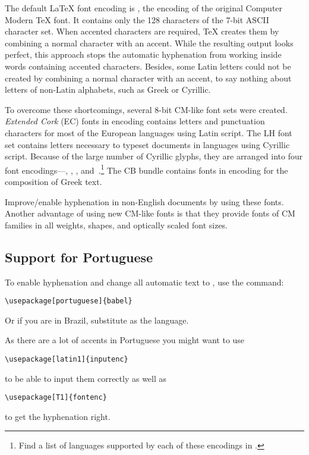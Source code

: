 The default \LaTeX{} font encoding is \label{OT1} , the encoding of the
original Computer Modern \TeX{} font. It contains only the 128
characters of the 7-bit ASCII character set. When accented characters
are required, \TeX{} creates them by combining a normal character with
an accent. While the resulting output looks perfect, this approach stops
the automatic hyphenation from working inside words containing accented
characters. Besides, some Latin letters could not be created by
combining a normal character with an accent, to say nothing about letters of
non-Latin alphabets, such as Greek or Cyrillic.

To overcome these shortcomings, several 8-bit CM-like font sets were created.
\emph{Extended Cork} (EC) fonts in  encoding contains 
letters and punctuation characters for most of the European
languages using Latin script. The LH font set contains letters necessary
to typeset documents in languages using Cyrillic script. Because of the large
number of Cyrillic glyphs, they are arranged into four font
encodings---, , ,
and~.\footnote{Find a list of languages supported by each of these
encodings in \cite{cyrguide}.} The CB bundle contains fonts
in  encoding for the composition of Greek text.

Improve/enable hyphenation in non-English
documents by using these fonts. Another advantage of using new CM-like fonts is that they 
provide fonts of CM families in all weights, shapes, and optically
scaled font sizes. 

\subsection{Support for Portuguese}

To enable hyphenation and change all automatic text to ,
 use the command:
\begin{lscommand}
\verb|\usepackage[portuguese]{babel}|
\end{lscommand}
Or if you are in Brazil, substitute \texttt{} as the language.

As there are a lot of accents in Portuguese you might want to use
\begin{lscommand}
\verb|\usepackage[latin1]{inputenc}|
\end{lscommand}
to be able to input them correctly as well as 
\begin{lscommand}
\verb|\usepackage[T1]{fontenc}|
\end{lscommand}
to get the hyphenation right.

